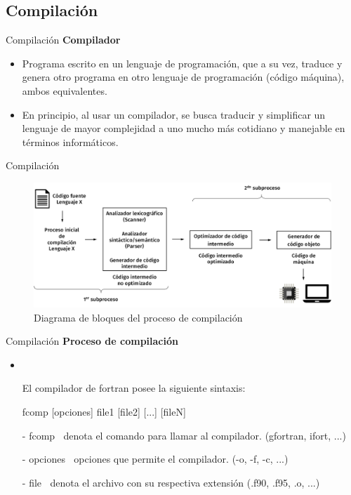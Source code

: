
\subsection{Compilación}

\begin{frame}[fragile]{Compilación}
\textbf{Compilador}
  \begin{itemize}[<+(1)->]
  \item Programa  escrito en un lenguaje de programación, que a su vez, traduce y genera otro programa
en otro lenguaje de programación (código máquina), ambos equivalentes.
  \item En principio, al usar un compilador, se busca traducir y simplificar un lenguaje de mayor complejidad a uno mucho más cotidiano y manejable en términos informáticos.
 \end{itemize}
\end{frame}


\begin{frame}[fragile]{Compilación} 
  \begin{figure}
    \includegraphics[width=1\textwidth]{./resources/compilation_op.png}
    \caption{Diagrama de bloques del proceso de compilación}
   \end{figure}
\end{frame}


\begin{frame}[fragile]{Compilación}
\textbf{Proceso de compilación}
  \begin{itemize}[<+(1)->]
  \item  
     
  \item []El compilador de fortran posee la siguiente sintaxis:
  \item [] 
     \begin{mintedbash} 
      fcomp [opciones] file1 [file2] [...] [fileN]
     \end{mintedbash}
  \item [-] fcomp $~$ denota el comando para llamar al compilador. (gfortran, ifort, ...)
  \item [-] opciones $~$ opciones que permite el compilador. (-o, -f, -c, ...)
  \item [-] file $~$ denota el archivo con su respectiva extensión (.f90, .f95, .o, ...)    
  \end{itemize}

\end{frame}